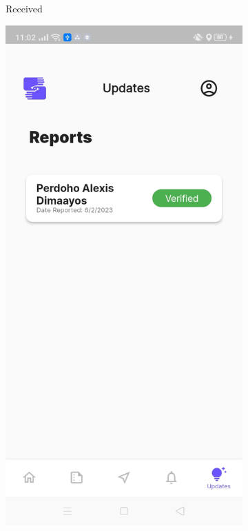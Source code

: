 \begin{figure}[!h]
\begin{subfigure}[c]{0.20\linewidth}
        \caption{Received}
        \label{fig:StatusReceived}
    \end{subfigure}
    \centering
    \begin{subfigure}[c]{0.20\linewidth}
        \centering
        \includegraphics[scale=0.10]{figures/Chapter4/Main/Report-2.jpg}

\end{subfigure}
\end{figure}
